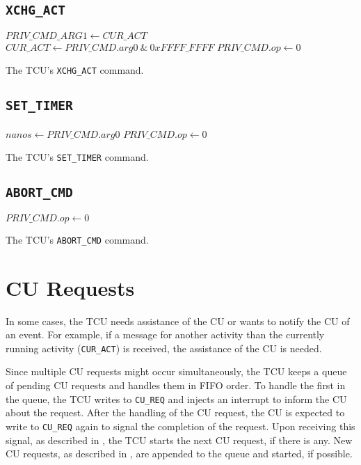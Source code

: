 \subsection{\texttt{XCHG\_ACT}}

\begin{algorithm}[H]
    $PRIV\_CMD\_ARG1 \gets CUR\_ACT$\;
    $CUR\_ACT \gets PRIV\_CMD.arg0\ \&\ 0xFFFF\_FFFF$\;
    \BlankLine
    $PRIV\_CMD.op \gets 0$\;
    \caption{The TCU's \texttt{XCHG\_ACT} command.}
\end{algorithm}

\subsection{\texttt{SET\_TIMER}}

\begin{algorithm}[H]
    $nanos \gets PRIV\_CMD.arg0$\;
    \BlankLine
    $PRIV\_CMD.op \gets 0$\;
    \caption{The TCU's \texttt{SET\_TIMER} command.}
\end{algorithm}

\subsection{\texttt{ABORT\_CMD}}

\begin{algorithm}[H]
    \BlankLine
    $PRIV\_CMD.op \gets 0$\;
    \caption{The TCU's \texttt{ABORT\_CMD} command.}
\end{algorithm}
\extend{}

\section{CU Requests}

In some cases, the TCU needs assistance of the CU or wants to notify the CU of an event. For
example, if a message for another activity than the currently running activity (\texttt{CUR\_ACT})
is received, the assistance of the CU is needed.

Since multiple CU requests might occur simultaneously, the TCU keeps a queue of pending CU requests
and handles them in FIFO order. To handle the first in the queue, the TCU writes to \texttt{CU\_REQ}
and injects an interrupt to inform the CU about the request. After the handling of the CU request,
the CU is expected to write to \texttt{CU\_REQ} again to signal the completion of the request. Upon
receiving this signal, as described in , the TCU starts the next CU request,
if there is any. New CU requests, as described in , are appended to the queue
and started, if possible.

